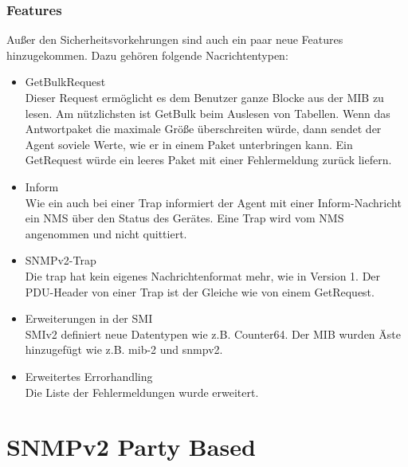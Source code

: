 \documentclass[11pt,a4paper]{article}
\begin{document}
\subsubsection{Features}
Außer den Sicherheitsvorkehrungen sind auch ein paar neue Features hinzugekommen. Dazu gehören folgende Nacrichtentypen:
\begin{itemize}
	\item 
		GetBulkRequest\\
		Dieser Request ermöglicht es dem Benutzer ganze Blocke aus der MIB zu lesen. Am nützlichsten ist GetBulk beim Auslesen von Tabellen. Wenn 				das Antwortpaket die maximale Größe überschreiten würde, dann sendet der Agent soviele Werte, wie er in einem Paket unterbringen kann. Ein 				GetRequest würde ein leeres Paket mit einer Fehlermeldung zurück liefern.
	\item
		Inform\\
		Wie ein auch bei einer Trap informiert der Agent mit einer Inform-Nachricht ein NMS über den Status des Gerätes. Eine Trap wird vom NMS 						angenommen und nicht quittiert.
	\item
		SNMPv2-Trap\\
		Die trap hat kein eigenes Nachrichtenformat mehr, wie in Version 1. Der PDU-Header von einer Trap ist der Gleiche wie von einem GetRequest.
	\item
		Erweiterungen in der SMI\\
		SMIv2 definiert neue Datentypen wie z.B. Counter64. Der MIB wurden Äste hinzugefügt wie z.B. mib-2 und snmpv2.
	\item
		Erweitertes Errorhandling\\
		Die Liste der Fehlermeldungen wurde erweitert.
\end{itemize}

\section{SNMPv2 Party Based}
\end{document}
